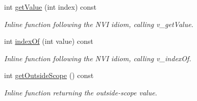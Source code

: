 \begin{DoxyCompactItemize}
int \hyperlink{classghost_1_1Domain_acf7b253ca1c490f90b8f80b5077f9b9c}{get\-Value} (int index) const 
\begin{DoxyCompactList}\small\item\em Inline function following the N\-V\-I idiom, calling v\-\_\-get\-Value. \end{DoxyCompactList}\item 
int \hyperlink{classghost_1_1Domain_ad82154e314a7f1029e5d1512047460fd}{index\-Of} (int value) const 
\begin{DoxyCompactList}\small\item\em Inline function following the N\-V\-I idiom, calling v\-\_\-index\-Of. \end{DoxyCompactList}\item 
int \hyperlink{classghost_1_1Domain_a08e1adce30f095a352a3c1a6937e7660}{get\-Outside\-Scope} () const 
\begin{DoxyCompactList}\small\item\em Inline function returning the outside-\/scope value. \end{DoxyCompactList}\end{DoxyCompactItemize}
